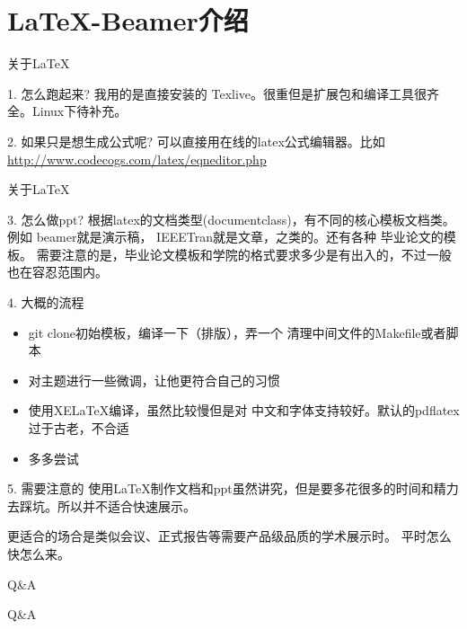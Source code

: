 \documentclass[utf8,dvipsnames,aspectratio=169]{beamer}
\newcommand\mk[1]{{\color{RoyalBlue} #1}}
\begin{document}
\section{\LaTeX-Beamer介绍}
\begin{frame}{关于\LaTeX}
	\begin{block}{1. 怎么跑起来?}
	\small 我用的是直接安装的\mk{Texlive}。很重但是扩展包和编译工具很齐全。Linux下待补充。
	\end{block}
	\begin{block}{2. 如果只是想生成公式呢?}
	\small 可以直接用在线的latex公式编辑器。比如
	\mk{\url{http://www.codecogs.com/latex/eqneditor.php}}
	\begin{figure}[thpb]
	\centering
	\label{fig:ai}
	\end{figure}
	\end{block}
	
\end{frame}
\begin{frame}{关于\LaTeX}
	\smaller[2]
	\begin{block}{3. 怎么做ppt?}
	根据latex的文档类型(documentclass)，有不同的核心模板文档类。例如\mk{beamer}就是演示稿，\mk{IEEETran}就是文章，之类的。还有各种\mk{毕业论文}的模板。
	需要注意的是，毕业论文模板和学院的格式要求多少是有出入的，不过一般也在容忍范围内。
	\end{block}
	\begin{block}{4. 大概的流程}
		\begin{itemize}
			\item<0-> \mk{git clone}初始模板，编译一下（排版），弄一个\mk{清理中间文件}的Makefile或者脚本
			\item<0-> 对主题进行一些微调，让他更符合自己的习惯
			\item<0-> 使用XE\LaTeX 编译，虽然比较慢但是对\mk{中文和字体}支持较好。默认的pdflatex过于古老，不合适
			\item<0-> \mk{多多尝试}
		\end{itemize}
	\end{block}	
	\begin{alertblock}{5. 需要注意的}
		使用\LaTeX 制作文档和ppt虽然讲究，但是要多花很多的时间和精力去踩坑。所以并不适合快速展示。
		
		更适合的场合是类似会议、正式报告等需要产品级品质的学术展示时。\mk{平时怎么快怎么来。}
	\end{alertblock}	
\end{frame}

\begin{frame}[plain]{Q\&A}
  \begin{center}
    \Huge Q\&A
  \end{center}
\end{frame}

\end{document}
